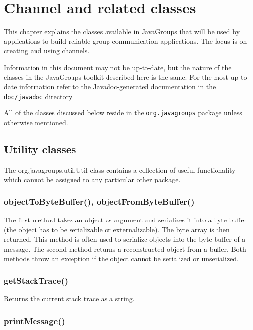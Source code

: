 
\chapter{Channel and related classes} \label{Channel}

This chapter explains the classes available in JavaGroups that will be used by
applications to build reliable group communication applications. The focus is on
creating and using channels.

Information in this document may not be up-to-date, but the nature of the classes in
the JavaGroups toolkit described here is the same. For the most up-to-date
information refer to the Javadoc-generated documentation in the {\tt
doc/javadoc} directory

All of the classes discussed below reside in the {\tt org.javagroups} package unless
otherwise mentioned.




  \section{Utility classes}

  The org.javagroups.util.Util class contains a collection of useful functionality
  which cannot be assigned to any particular other package.


    \subsection{objectToByteBuffer(), objectFromByteBuffer()} \label{ObjectToBB}

    The first method takes an object as argument and serializes it into a byte buffer
    (the object has to be serializable or externalizable). The byte array is then
    returned. This method is often used to serialize objects into the byte buffer of
    a message. The second method returns a reconstructed object from a buffer. Both
    methods throw an exception if the object cannot be serialized or unserialized.


    \subsection{getStackTrace()}

    Returns the current stack trace as a string.

    \subsection{printMessage()}
    

